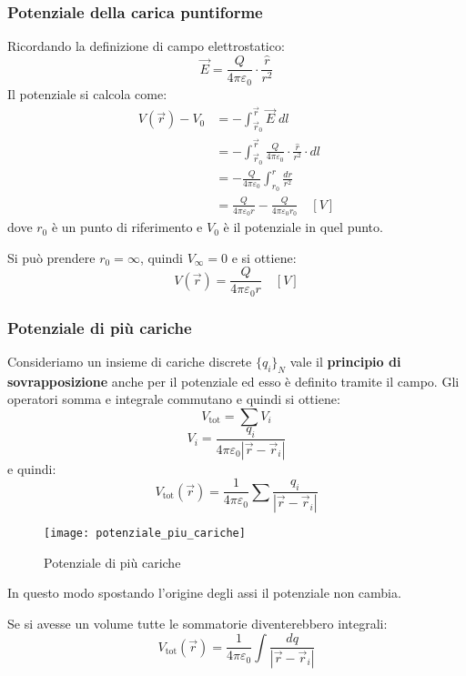 \documentclass[a4paper]{article}
\begin{document}
\subsubsection{Potenziale della carica puntiforme}
Ricordando la definizione di campo elettrostatico:
\[
  \vec{E} = \frac{Q}{4 \pi \varepsilon_0} \cdot \frac{\hat{r}}{r^2}
\] 
Il potenziale si calcola come:
\[
  \begin{aligned}
    V(\vec{r}) - V_0 &= - \int_{\vec{r}_0}^{\vec{r}} \vec{E} \; dl \\
                     &= - \int_{\vec{r}_0}^{\vec{r}} \frac{Q}{4 \pi \varepsilon_0}
                     \cdot \frac{\hat{r}}{r^2} \cdot  dl \\
                     &= - \frac{Q}{4 \pi \varepsilon_0} \int_{r_0}^{r} \frac{dr}{r^2} \\
                     &= \frac{Q}{4 \pi \varepsilon_0 r} -
                     \frac{Q}{4 \pi \varepsilon_0 r_0} \quad \left[ V \right]
  \end{aligned}
\] 
dove \( r_0 \) è un punto di riferimento e \( V_0 \) è il potenziale in quel punto.

Si può prendere \( r_0 = \infty \), quindi \( V_\infty = 0 \) e si ottiene:
\[
  V(\vec{r}) = \frac{Q}{4 \pi \varepsilon_0 r} \quad \left[ V \right]
\] 

\subsubsection{Potenziale di più cariche}
Consideriamo un insieme di cariche discrete \( \{q_i\}_N \) vale il \textbf{principio
di sovrapposizione} anche per il potenziale ed esso è definito tramite il campo.
Gli operatori somma e integrale commutano e quindi si ottiene:
\[
  V_{\text{tot}} = \sum V_i
\] 
\[
  V_i = \frac{q_i}{4 \pi \varepsilon_0 |\vec{r} - \vec{r}_i|}
\] 
e quindi:
\[
  V_{\text{tot}}(\vec{r}) = \frac{1}{4 \pi \varepsilon_0} \sum \frac{q_i}{|\vec{r}-\vec{r}_i|}
\] 
\begin{figure}[H]
  \centering
  \texttt{[image: potenziale\_piu\_cariche]}
  \caption{Potenziale di più cariche}
\end{figure}
\noindent
In questo modo spostando l'origine degli assi il potenziale non cambia.

\vspace{1em}
\noindent
Se si avesse un volume tutte le sommatorie diventerebbero integrali:
\[
  V_{\text{tot}}(\vec{r}) = \frac{1}{4 \pi \varepsilon_0} \int \frac{dq}{|\vec{r} - \vec{r}_i|}
\] 
\end{document}
